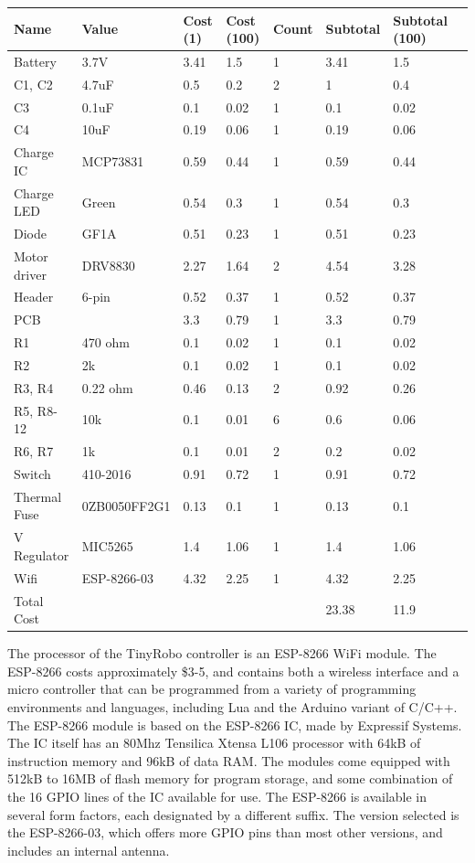 \documentclass[]{article}
\begin{document}
 \begin{table}
	\begin{tabular}{l l l l l l l l }
	Name & Value & Cost (1) & Cost (100) & Count & Subtotal & Subtotal (100)\\
 	\hline
Battery & 3.7V & 3.41 & 1.5 & 1 & 3.41 & 1.5\\
C1, C2 & 4.7uF & 0.5 & 0.2 & 2 & 1 & 0.4\\
C3 & 0.1uF & 0.1 & 0.02 & 1 & 0.1 & 0.02\\
C4 & 10uF & 0.19 & 0.06 & 1 & 0.19 & 0.06\\
Charge IC & MCP73831 & 0.59 & 0.44 & 1 & 0.59 & 0.44\\
Charge LED & Green & 0.54 & 0.3 & 1 & 0.54 & 0.3\\
Diode & GF1A & 0.51 & 0.23 & 1 & 0.51 & 0.23\\
Motor driver & DRV8830 & 2.27 & 1.64 & 2 & 4.54 & 3.28\\
Header & 6-pin  & 0.52 & 0.37 & 1 & 0.52 & 0.37\\
PCB &  & 3.3 & 0.79 & 1 & 3.3 & 0.79\\
R1 & 470 ohm & 0.1 & 0.02 & 1 & 0.1 & 0.02\\
R2 & 2k & 0.1 & 0.02 & 1 & 0.1 & 0.02\\
R3, R4 & 0.22 ohm & 0.46 & 0.13 & 2 & 0.92 & 0.26\\
R5, R8-12 & 10k & 0.1 & 0.01 & 6 & 0.6 & 0.06\\
R6, R7 & 1k & 0.1 & 0.01 & 2 & 0.2 & 0.02\\
Switch & 410-2016 & 0.91 & 0.72 & 1 & 0.91 & 0.72\\
Thermal Fuse & 0ZB0050FF2G1 & 0.13 & 0.1 & 1 & 0.13 & 0.1\\
V Regulator & MIC5265 & 1.4 & 1.06 & 1 & 1.4 & 1.06\\
Wifi & ESP-8266-03 & 4.32 & 2.25 & 1 & 4.32 & 2.25\\
\hline
Total Cost &  &  &  &  & 23.38 & 11.9\\
 	\end{tabular}
 \end{table}
 
The processor of the TinyRobo controller is an ESP-8266 WiFi module.
The ESP-8266 costs approximately \$3-5, and contains both a wireless interface and a micro controller that can be programmed from a variety of programming environments and languages, including Lua and the Arduino variant of C/C++. The ESP-8266 module is based on the ESP-8266 IC, made by Expressif Systems. The IC itself has an 80Mhz Tensilica Xtensa L106 processor with 64kB of instruction memory and 96kB of data RAM. The modules come equipped with 512kB to 16MB of flash memory for program storage, and some combination of the 16 GPIO lines of the IC available for use. 
The ESP-8266 is available in several form factors, each designated by a different suffix. 
The version selected is the ESP-8266-03, which offers more GPIO pins than most other versions, and includes an internal antenna.
\end{document}
